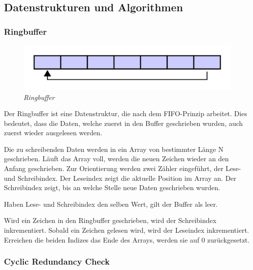\subsection{Datenstrukturen und Algorithmen}
\subsubsection{Ringbuffer}

\begin{figure}
     \vspace{-\baselineskip}
         \centering
         \includegraphics[scale=0.1]{Pictures/circular_buffer.png}
         \caption{\textit{Ringbuffer \citep{ImgBuffer}}}
         \label{img:Ringbuffer}
 \end{figure}

Der Ringbuffer ist eine Datenstruktur, die nach dem \ac{FIFO}-Prinzip arbeitet. Dies bedeutet, dass die Daten, welche
zuerst in den Buffer geschrieben wurden, auch zuerst wieder ausgelesen werden. 

\smallskip

Die zu schreibenden Daten werden in ein Array von bestimmter Länge N geschrieben. Läuft das Array voll, werden die neuen Zeichen
wieder an den Anfang geschrieben. Zur Orientierung werden zwei Zähler eingeführt, der Lese- und Schreibindex. Der Leseindex
zeigt die aktuelle Position im Array an. Der Schreibindex zeigt, bis an welche Stelle
neue Daten geschrieben wurden.  

Haben Lese- und Schreibindex den selben Wert, gilt der Buffer als leer. 

\smallskip

Wird ein Zeichen in den Ringbuffer geschrieben, wird der Schreibindex inkrementiert. Sobald ein Zeichen gelesen wird, wird der Leseindex
inkrementiert. Erreichen die beiden Indizes das Ende des Arrays, werden sie auf 0 zurückgesetzt.


\subsubsection{Cyclic Redundancy Check}
\label{subsub: CRC16}

